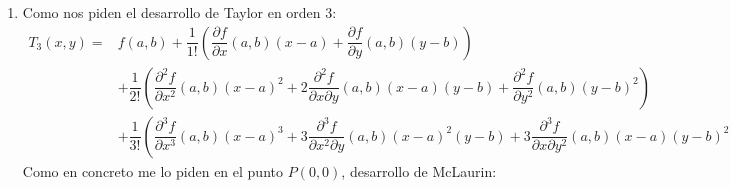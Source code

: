 \begin{enumerate}[label=\color{red}\textbf{\arabic*)}, leftmargin=*]
		$T_2(x,y)=f(a,b)+\dfrac{1}{1!}\left(\dfrac{\partial f}{\partial x}(a,b)(x-a)+\dfrac{\partial f}{\partial y}(a,b)(y-b)\right)+\dfrac{1}{2!}\left(\dfrac{\partial^2f }{\partial x^2}(a,b)(x-a)^2+\dfrac{\partial^2 f}{\partial y\partial x}(x-a)(y-b)+\dfrac{\partial^2f}{\partial y^2}(a,b)(y-b)^2\right)$
		
		En concreto queremos que $P(a,b)=P(2,-1)$
		
		$T_2(x,y)=f(2,-1)+\dfrac{1}{1!}\left(\dfrac{\partial f}{\partial x}(2,-1)(x-2)+\dfrac{\partial f}{\partial y}(2,-1)(y+1)\right)+\linebreak\dfrac{1}{2!}\left(\dfrac{\partial^2f }{\partial x^2}(2,-1)(x-2)^2+\dfrac{\partial^2 f}{\partial y\partial x}(2,-1)(x-2)(y-1)+\dfrac{\partial^2f}{\partial y^2}(2,-1)(y+1)^2\right)$
		
		$\begin{array}{l:l}
		f(x,y)=e^{x+2y}\longrightarrow (2,-1)=1 & \dfrac{\partial^2 f}{\partial x^2}(x,y)=e^{x+2y}\longrightarrow(2,-1)=1\\
		\dfrac{\partial f}{\partial x}(x,y)=e^{x+2y}\longrightarrow(2,-1)=1 & \dfrac{\partial^2f}{\partial y^2}(x,y)=4e^{x+2y}\longrightarrow(2,-1)=4\\
		\dfrac{\partial f}{\partial y}(x,y)=2e^{x+2y}\longrightarrow(2,-1)=2&\dfrac{\partial^2f}{\partial y\partial x}(x,y)=2e^{x+2y}\longrightarrow(2,-1)=2\\
		\end{array}$
		
		Sustituyendo tenemos que:
		
		$\begin{array}{l}
		T_2(x,y)=1+(x-2)+2(y+1)+\dfrac{1}{2}\left((x-2)^2+2\cdot2\cdot(x-2)(y+1)+4(y+1)^2\right)\\
		\bboxed{T_2(x,y)=1+(x-2)+\dfrac{1}{2}(x-2)^2+2(x-2)(y+1)+2(y+1)^2}
		\end{array}$
		
		\item {}
		
		
		Como nos piden el desarrollo de Taylor en orden 3:\\
		 $\begin{aligned}
		 T_3(x,y)=&f(a,b)+\dfrac{1}{1!}\left(\dfrac{\partial f}{\partial x}(a,b)(x-a)+\dfrac{\partial f}{\partial y}(a,b)(y-b)\right)\\
		 &+\dfrac{1}{2!}\left(\dfrac{\partial ^2f}{\partial x^2}(a,b)(x-a)^2+2\dfrac{\partial^2 f}{\partial x\partial y}(a,b)(x-a)(y-b)+\dfrac{\partial^2f}{\partial y^2}(a,b)(y-b)^2\right)\\
		 &+\dfrac{1}{3!}\left(\dfrac{\partial^3f}{\partial x^3}(a,b)(x-a)^3+3\dfrac{\partial^3f}{\partial x^2\partial y}(a,b)(x-a)^2(y-b)+3\dfrac{\partial^3f}{\partial x\partial y^2}(a,b)(x-a)(y-b)^2+\dfrac{\partial^3f}{\partial y^3}(a,b)(y-b)^3\right)
		 \end{aligned}$\\
		 Como en concreto me lo piden en el punto $P(0,0)$, desarrollo de McLaurin:
		 

\end{enumerate}
